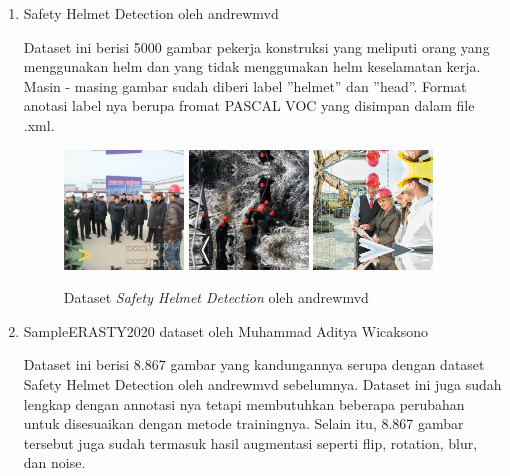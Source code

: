 \begin{enumerate}
  \item Safety Helmet Detection oleh andrewmvd
  \par Dataset ini berisi 5000 gambar pekerja konstruksi yang meliputi orang yang menggunakan helm dan yang tidak menggunakan helm keselamatan kerja. Masin - masing
  gambar sudah diberi label ”helmet” dan ”head”. Format anotasi label nya berupa
  fromat PASCAL VOC yang disimpan dalam file .xml.   

  \begin{figure}[ht]
    \centering
    \includegraphics[width=0.3\textwidth]{gambar/sample_kaggle1/hard_hat_workers0.png}
    \includegraphics[width=0.3\textwidth]{gambar/sample_kaggle1/hard_hat_workers1.png}
    \includegraphics[width=0.3\textwidth]{gambar/sample_kaggle1/hard_hat_workers19.png}
    \caption{Dataset \emph{Safety Helmet Detection} oleh andrewmvd}
    \label{fig:datasethelmetdetectionpreview}  
  \end{figure}

  \item SampleERASTY2020 dataset oleh Muhammad Aditya Wicaksono
  \par Dataset ini berisi 8.867 gambar yang kandungannya serupa dengan dataset Safety Helmet 
  Detection oleh andrewmvd sebelumnya. Dataset ini juga sudah lengkap dengan annotasi nya tetapi 
  membutuhkan beberapa perubahan untuk disesuaikan dengan  metode trainingnya. 
  Selain itu, 8.867 gambar tersebut juga sudah termasuk hasil augmentasi seperti flip, 
  rotation, blur, dan noise.


\end{enumerate}
